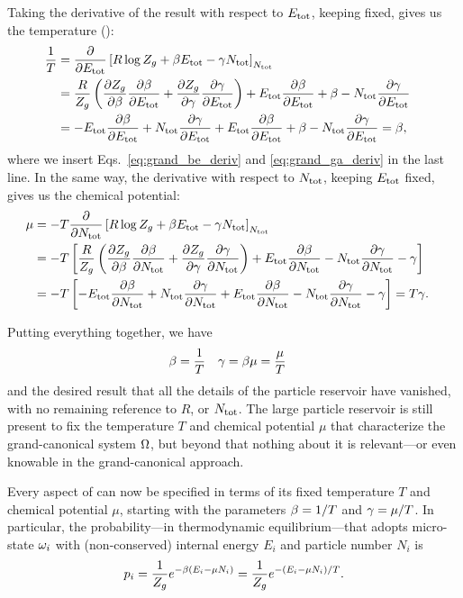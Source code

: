 \newpage %
Taking the derivative of the result with respect to $E_{\text{tot}}$, keeping \Ntot fixed, gives us the temperature ():
\begin{align}
  \frac{1}{T} & = \frac{\partial }{\partial E_{\text{tot}}}\left[R\log Z_g + \beta E_{\text{tot}} - \gamma N_{\text{tot}}\right]_{N_{\text{tot}}} \cr
              & = \frac{R}{Z_g}\left(\frac{\partial Z_g}{\partial \beta}\frac{\partial \beta}{\partial E_{\text{tot}}} + \frac{\partial Z_g}{\partial \gamma}\frac{\partial \gamma}{\partial E_{\text{tot}}}\right) + E_{\text{tot}}\frac{\partial \beta}{\partial E_{\text{tot}}} + \beta - N_{\text{tot}}\frac{\partial \gamma}{\partial E_{\text{tot}}} \cr
              & = -E_{\text{tot}}\frac{\partial \beta}{\partial E_{\text{tot}}} + N_{\text{tot}}\frac{\partial \gamma}{\partial E_{\text{tot}}} + E_{\text{tot}}\frac{\partial \beta}{\partial E_{\text{tot}}} + \beta - N_{\text{tot}}\frac{\partial \gamma}{\partial E_{\text{tot}}} = \beta,
\end{align}
where we insert Eqs.~\ref{eq:grand_be_deriv} and \ref{eq:grand_ga_deriv} in the last line.
In the same way, the derivative with respect to $N_{\text{tot}}$, keeping $E_{\text{tot}}$ fixed, gives us the chemical potential:
\begin{align}
  \mu & = -T \frac{\partial }{\partial N_{\text{tot}}}\left[R\log Z_g + \beta E_{\text{tot}} - \gamma N_{\text{tot}}\right]_{N_{\text{tot}}} \cr
      & = -T\left[\frac{R}{Z_g}\left(\frac{\partial Z_g}{\partial \beta}\frac{\partial \beta}{\partial N_{\text{tot}}} + \frac{\partial Z_g}{\partial \gamma}\frac{\partial \gamma}{\partial N_{\text{tot}}}\right) + E_{\text{tot}}\frac{\partial \beta}{\partial N_{\text{tot}}} - N_{\text{tot}}\frac{\partial \gamma}{\partial N_{\text{tot}}} - \gamma\right] \cr
      & = -T\left[-E_{\text{tot}}\frac{\partial \beta}{\partial N_{\text{tot}}} + N_{\text{tot}}\frac{\partial \gamma}{\partial N_{\text{tot}}} + E_{\text{tot}}\frac{\partial \beta}{\partial N_{\text{tot}}} - N_{\text{tot}}\frac{\partial \gamma}{\partial N_{\text{tot}}} - \gamma\right] = T\gamma.
\end{align}

Putting everything together, we have
\begin{align}
  \beta & = \frac{1}{T} &
  \gamma & = \beta \mu = \frac{\mu}{T}
\end{align}
and the desired result that all the details of the particle reservoir have vanished, with no remaining reference to $R$, \Etot or $N_{\text{tot}}$.
The large particle reservoir is still present to fix the temperature $T$ and chemical potential $\mu$ that characterize the grand-canonical system $\Omega$, but beyond that nothing about it is relevant---or even knowable in the grand-canonical approach.

Every aspect of \Om can now be specified in terms of its fixed temperature $T$ and chemical potential $\mu$, starting with the parameters $\beta = 1 / T$ and $\gamma = \mu / T$.
In particular, the probability---in thermodynamic equilibrium---that \Om adopts micro-state $\omega_i$ with (non-conserved) internal energy $E_i$ and particle number $N_i$ is
\begin{equation}
  \label{eq:grand_prob}
  p_i = \frac{1}{Z_g} e^{-\beta (E_i - \mu N_i)} = \frac{1}{Z_g} e^{-(E_i - \mu N_i) / T}.
\end{equation}

